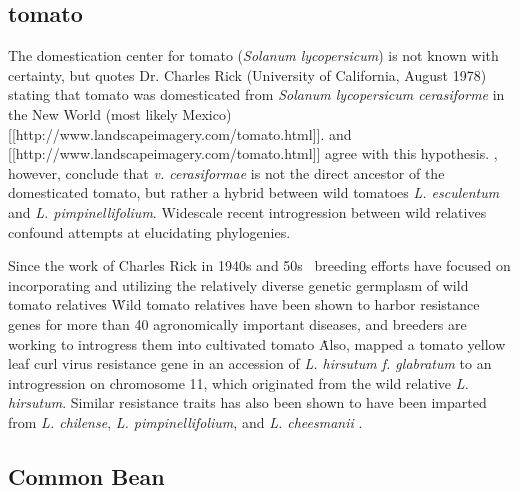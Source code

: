 \documentclass[11pt]{article}
\begin{document}
\subsection*{tomato}

The domestication center for tomato (\emph{Solanum lycopersicum}) is not known with certainty, but \cite{sims1979history} quotes Dr. Charles Rick (University of California, August 1978) stating that tomato was domesticated from \emph{Solanum lycopersicum cerasiforme} in the New World (most likely Mexico) [[http://www.landscapeimagery.com/tomato.html]].
\cite{robertson2007genetic, bai2007domestication} and [[http://www.landscapeimagery.com/tomato.html]] agree with this hypothesis.
\cite{nesbitt2002comparative}, however, conclude that \emph{v. cerasiformae} is not the direct ancestor of the domesticated tomato, but rather a hybrid between wild tomatoes \emph{L. esculentum} and \emph{L. pimpinellifolium}.
Widescale recent introgression between wild relatives confound attempts at elucidating phylogenies.

Since the work of Charles Rick in 1940s and 50s \cite{rick1953novel}\, breeding efforts have focused on incorporating and utilizing the relatively diverse genetic germplasm of wild tomato relatives \cite{rick1988tomato, miller1990rflp, rick1982potential}\.
Wild tomato relatives have been shown to harbor resistance genes for more than 40 agronomically important diseases, and breeders are working to introgress them into cultivated tomato \cite{rick1995utilization}\.
Also, \cite{hanson2000mapping} mapped a tomato yellow leaf curl virus resistance gene in an accession of \emph{L. hirsutum f. glabratum} \cite{banerjee1990transfer} to an introgression on chromosome 11, which originated from the wild relative \emph{L. hirsutum}.
Similar resistance traits has also been shown to have been imparted from \emph{L. chilense}, \emph{L. pimpinellifolium}, and \emph{L. cheesmanii} \cite{hanson2000mapping}.

















\subsection*{Common Bean}
\end{document}
